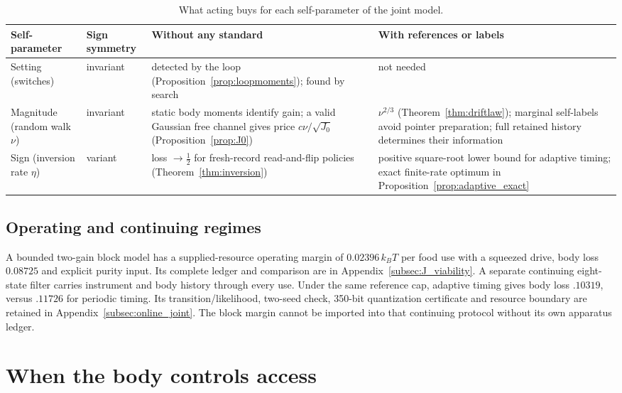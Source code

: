 \documentclass[12pt]{article}
\theoremstyle{definition}
\begin{document}
\begin{table}[t]
\centering
\small
\begin{tabular}{@{}P{3.0cm}P{1.7cm}P{4.0cm}P{3.9cm}@{}}
\toprule
Self-parameter & Sign symmetry & Without any standard & With references or labels\\
\midrule
Setting (switches) & invariant & detected by the loop (Proposition~\ref{prop:loopmoments}); found by search & not needed\\[3pt]
Magnitude (random walk $\nu$) & invariant & static body moments identify gain; a valid Gaussian free channel gives price $c\nu/\sqrt{J_0}$ (Proposition~\ref{prop:J0}) & $\nu^{2/3}$ (Theorem~\ref{thm:driftlaw}); marginal self-labels avoid pointer preparation; full retained history determines their information\\[3pt]
Sign (inversion rate $\eta$) & variant & loss $\to\tfrac12$ for fresh-record read-and-flip policies (Theorem~\ref{thm:inversion}) & positive square-root lower bound for adaptive timing; exact finite-rate optimum in Proposition~\ref{prop:adaptive_exact}\\
\bottomrule
\end{tabular}
\caption{What acting buys for each self-parameter of the joint model.}
\label{tab:threelaws}
\end{table}

\subsection{Operating and continuing regimes}
A bounded two-gain block model has a supplied-resource operating margin
of $0.02396\,k_BT$ per food use with a squeezed drive, body loss
$0.08725$ and explicit purity input. Its complete ledger and comparison
are in Appendix~\ref{subsec:J_viability}.
A separate continuing eight-state filter carries instrument and body
history through every use. Under the same reference cap, adaptive
timing gives body loss $.10319$, versus $.11726$ for periodic timing.
Its transition/likelihood, two-seed check, 350-bit quantization certificate
and resource boundary are retained in Appendix~\ref{subsec:online_joint}.
The block margin cannot be imported into that continuing protocol
without its own apparatus ledger.

\section{When the body controls access}
\label{subsec:body_access}
\end{document}
